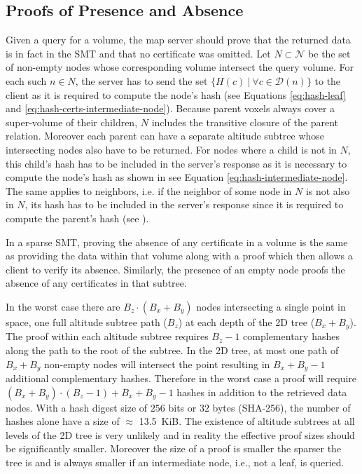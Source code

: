 \documentclass[10pt,conference,compsocconf]{IEEEtran}
\begin{document}
\subsection{Proofs of Presence and Absence}
\label{sec:data-structure:precense-absence}
Given a query for a volume, the map server should prove that the returned data is in fact in the SMT and that no certificate was omitted.
Let $N \subset \mathcal{N}$ be the set of non-empty nodes whose corresponding volume intersect the query volume.
For each such $n \in N$, the server has to send the set $\{H(c) \: | \: \forall c \in \mathcal{D}(n) \}$ to the client as it is required to compute the node's hash (see Equations \ref{eq:hash-leaf} and \ref{eq:hash-certs-intermediate-node}).
Because parent voxels always cover a super-volume of their children, $N$ includes the transitive closure of the parent relation.
Moreover each parent can have a separate altitude subtree whose intersecting nodes also have to be returned.
For nodes where a child is not in $N$, this child's hash has to be included in the server's response as it is necessary to compute the node's hash as shown in see Equation \ref{eq:hash-intermediate-node}.
The same applies to neighbors, i.e. if the neighbor of some node in $N$ is not also in $N$, its hash has to be included in the server's response since it is required to compute the parent's hash (see ).

In a sparse SMT, proving the absence of any certificate in a volume is the same as providing the data  within that volume along with a proof which then allows a client to verify its absence.
Similarly, the presence of an empty node proofs the absence of any certificates in that subtree.

In the worst case there are $B_z \cdot (B_x + B_y)$ nodes intersecting a single point in space, one full altitude subtree path ($B_z$) at each depth of the 2D tree ($B_x + B_y$).
The proof within each altitude subtree requires $B_z - 1$ complementary hashes along the path to the root of the subtree.
In the 2D tree, at most one path of $B_x + B_y$ non-empty nodes will intersect the point resulting in $B_x + B_y - 1$ additional complementary hashes.
Therefore in the worst case a proof will require $(B_x + B_y) \cdot (B_z - 1) + B_x + B_y - 1$ hashes in addition to the retrieved data nodes.
With a hash digest size of $256$ bits or $32$ bytes (SHA-256), the number of hashes alone have a size of $\approx$ 13.5~KiB.
The existence of altitude subtrees at all levels of the 2D tree is very unlikely and in reality the effective proof sizes should be significantly smaller.
Moreover the size of a proof is smaller the sparser the tree is and is always smaller if an intermediate node, i.e., not a leaf, is queried.
\end{document}
